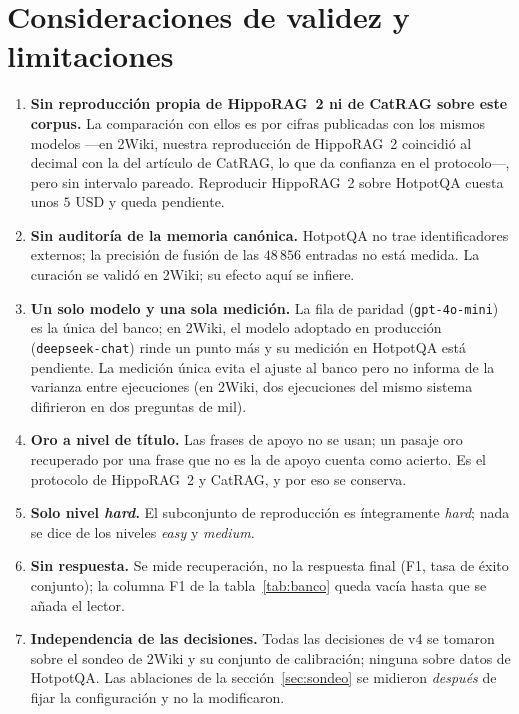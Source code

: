 \documentclass[11pt,a4paper]{article}
\newcommand{\hippo}{HippoRAG~2}
\begin{document}
\section{Consideraciones de validez y limitaciones}
\label{sec:validez}

\begin{enumerate}[leftmargin=1.6em, itemsep=1pt]
\item \textbf{Sin reproducción propia de \hippo{} ni de CatRAG sobre este
  corpus.} La comparación con ellos es por cifras publicadas con los mismos
  modelos ---en 2Wiki, nuestra reproducción de \hippo{} coincidió al decimal
  con la del artículo de CatRAG, lo que da confianza en el protocolo---,
  pero sin intervalo pareado. Reproducir \hippo{} sobre HotpotQA cuesta
  unos $5$ USD y queda pendiente.
\item \textbf{Sin auditoría de la memoria canónica.} HotpotQA no trae
  identificadores externos; la precisión de fusión de las $48\,856$ entradas
  no está medida. La curación se validó en 2Wiki; su efecto aquí se infiere.
\item \textbf{Un solo modelo y una sola medición.} La fila de paridad
  (\texttt{gpt-4o-mini}) es la única del banco; en 2Wiki, el modelo adoptado
  en producción (\texttt{deepseek-chat}) rinde un punto más y su medición en
  HotpotQA está pendiente. La medición única evita el ajuste al banco pero
  no informa de la varianza entre ejecuciones (en 2Wiki, dos ejecuciones
  del mismo sistema difirieron en dos preguntas de mil).
\item \textbf{Oro a nivel de título.} Las frases de apoyo no se usan; un
  pasaje oro recuperado por una frase que no es la de apoyo cuenta como
  acierto. Es el protocolo de \hippo{} y CatRAG, y por eso se conserva.
\item \textbf{Solo nivel \emph{hard}.} El subconjunto de reproducción es
  íntegramente \emph{hard}; nada se dice de los niveles \emph{easy} y
  \emph{medium}.
\item \textbf{Sin respuesta.} Se mide recuperación, no la respuesta final
  (F1, tasa de éxito conjunto); la columna F1 de la tabla~\ref{tab:banco}
  queda vacía hasta que se añada el lector.
\item \textbf{Independencia de las decisiones.} Todas las decisiones de v4 se
  tomaron sobre el sondeo de 2Wiki y su conjunto de calibración; ninguna
  sobre datos de HotpotQA. Las ablaciones de la sección~\ref{sec:sondeo} se
  midieron \emph{después} de fijar la configuración y no la modificaron.
\end{enumerate}
\end{document}
